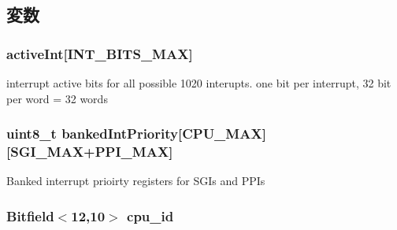 \subsection{変数}
\hypertarget{classPl390_ab1d4b1ab244021ea7a23b2cbcd2fbdb9}{
\subsubsection[{ack\_\-id}]{}}
\label{classPl390_ab1d4b1ab244021ea7a23b2cbcd2fbdb9}
\hypertarget{classPl390_a48d93d135c28a30df624e36d86856ab8}{
\subsubsection[{activeInt}]{ {\bf activeInt}\mbox{[}{\bf INT\_\-BITS\_\-MAX}\mbox{]}}}
\label{classPl390_a48d93d135c28a30df624e36d86856ab8}
interrupt active bits for all possible 1020 interupts. one bit per interrupt, 32 bit per word = 32 words \hypertarget{classPl390_a30d4209f73a9d8d2478774b12a477910}{
\subsubsection[{bankedIntPriority}]{\setlength{\rightskip}{0pt plus 5cm}uint8\_\-t {\bf bankedIntPriority}\mbox{[}{\bf CPU\_\-MAX}\mbox{]}\mbox{[}{\bf SGI\_\-MAX}+{\bf PPI\_\-MAX}\mbox{]}}}
\label{classPl390_a30d4209f73a9d8d2478774b12a477910}
Banked interrupt prioirty registers for SGIs and PPIs \hypertarget{classPl390_a0fde3389d812c2863113c78e0d23108a}{
\subsubsection[{cpu\_\-id}]{\setlength{\rightskip}{0pt plus 5cm}Bitfield$<$12,10$>$ {\bf cpu\_\-id}}}
